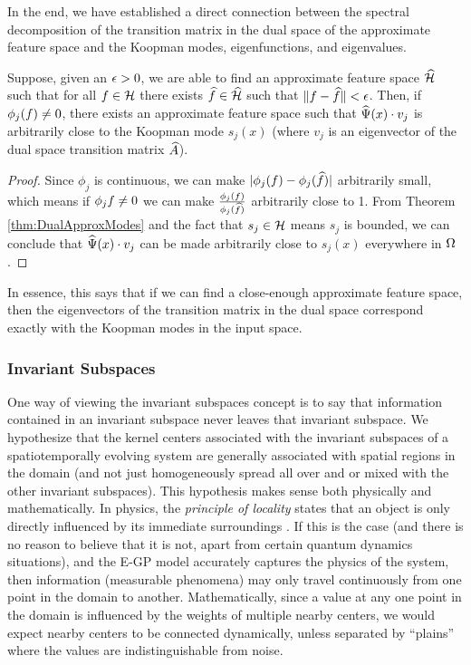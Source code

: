 In the end, we have established a direct connection between the spectral decomposition of the transition matrix in the dual space of the approximate feature space and the Koopman modes, eigenfunctions, and eigenvalues. 
\begin{corollary}\label{cor:ModesApprox}
	Suppose, given an $\epsilon>0$, we are able to find an approximate feature space $\widehat{\mathcal{H}}$ such that for all $f\in\mathcal{H}$ there exists $\widehat{f}\in\widehat{\mathcal{H}}$ such that $\|f - \widehat{f}\| < \epsilon$. Then, if $\phi_j(f) \neq 0$, there exists an approximate feature space such that $\widehat{\Psi}(x) \cdot v_j$ is arbitrarily close to the Koopman mode $s_j(x)$ (where $v_j$ is an eigenvector of the dual space transition matrix $\widehat{A}$).
\end{corollary}
\begin{proof}
	Since $\phi_j$ is continuous, we can make $|\phi_j(f) - \phi_j(\widehat{f})|$ arbitrarily small, which means if $\phi_j{f} \neq 0$ we can make $\frac{\phi_j(f)}{\phi_j(\widehat{f})}$ arbitrarily close to 1. From Theorem \ref{thm:DualApproxModes} and the fact that $s_j\in\mathcal{H}$ means $s_j$ is bounded, we can conclude that $\widehat{\Psi}(x) \cdot v_j$ can be made arbitrarily close to $s_j(x)$ everywhere in $\Omega$. %
	
\end{proof}
In essence, this says that if we can find a close-enough approximate feature space, then the eigenvectors of the transition matrix in the dual space correspond exactly with the Koopman modes in the input space.




\subsubsection{Invariant Subspaces}

One way of viewing the invariant subspaces concept is to say that information contained in an invariant subspace never leaves that invariant subspace. We hypothesize that the kernel centers associated with the invariant subspaces of a spatiotemporally evolving system are generally associated with spatial regions in the domain (and not just homogeneously spread all over and or mixed with the other invariant subspaces). This hypothesis makes sense both physically and mathematically. In physics, the \emph{principle of locality} states that an object is only directly influenced by its immediate surroundings \cite{berkovitz2007action}. If this is the case (and there is no reason to believe that it is not, apart from certain quantum dynamics situations), and the E-GP model accurately captures the physics of the system, then information (measurable phenomena) may only travel continuously from one point in the domain to another. Mathematically, since a value at any one point in the domain is influenced by the weights of multiple nearby centers, we would expect nearby centers to be connected dynamically, unless separated by ``plains'' where the values are indistinguishable from noise.

